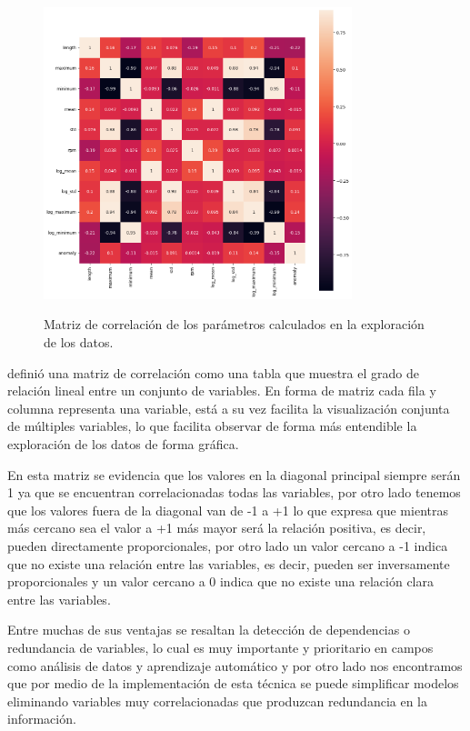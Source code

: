 \documentclass[11pt,a4paper,spanish]{book}
\numberwithin{equation}{chapter}
\numberwithin{figure}{chapter}
\begin{document}
\begin{figure}[H]
    \caption{Matriz de correlación de los parámetros calculados en la exploración de los datos. }
    \centering
    \includegraphics[width=0.8\textwidth]{media/dataset/corr-mat.png}
    \label{fig:figCorrMat}
\end{figure}


\cite{Alvarez2023} definió una matriz de correlación como una tabla que muestra el grado 
de relación lineal entre un conjunto de variables. En forma de matriz cada fila y 
columna representa una variable, está a su vez facilita la visualización conjunta de 
múltiples variables, lo que facilita observar de forma más entendible la exploración de 
los datos de forma gráfica.


En esta matriz se evidencia que los valores en la diagonal principal siempre serán 1 ya 
que se encuentran correlacionadas todas las variables, por otro lado tenemos que los 
valores fuera de la diagonal van de -1 a +1 lo que expresa que mientras más cercano sea 
el valor a +1 más mayor será la relación positiva, es decir, pueden directamente 
proporcionales, por otro lado un valor cercano a -1 indica que no existe una relación 
entre las variables, es decir, pueden ser inversamente proporcionales y un valor cercano 
a 0 indica que no existe una relación clara entre las variables. \cite{Alvarez2023}


Entre muchas de sus ventajas se resaltan la detección de dependencias o redundancia de 
variables, lo cual es muy importante y prioritario en campos como análisis de datos y 
aprendizaje automático y por otro lado nos encontramos que por medio de la implementación
de esta técnica se puede simplificar modelos eliminando variables muy correlacionadas que 
produzcan redundancia en la información. \cite{Alvarez2023}
\end{document}
